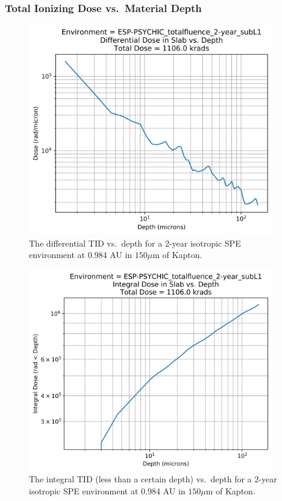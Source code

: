 \documentclass{hitec}
\begin{document}
\newpage
\subsubsection{Total Ionizing Dose vs.\ Material Depth}
\label{sssec:TID-SPE-Dose vs Depth}

\begin{figure}[htbp!]
	\centering
	\includegraphics[width=0.95\textwidth]{../ESP-PSYCHIC_totalfluence_2-year_subL1_Differential_Dose_vs_Depth.png}
	\caption{The differential TID vs.\ depth for a 2-year isotropic SPE environment at 0.984 AU in $150 \mu$m of Kapton.}\label{fig:ESP-PSYCHIC_totalfluence_2-year_subL1_Differential_Dose_vs_Depth}
\end{figure}

\begin{figure}[htbp!]
	\centering
	\includegraphics[width=0.95\textwidth]{../ESP-PSYCHIC_totalfluence_2-year_subL1_Integral_Dose_vs_Depth.png}
	\caption{The integral TID (less than a certain depth) vs.\ depth for a 2-year isotropic SPE environment at 0.984 AU in $150 \mu$m of Kapton.}\label{fig:ESP-PSYCHIC_totalfluence_2-year_subL1_Integral_Dose_vs_Depth}
\end{figure}
\end{document}
